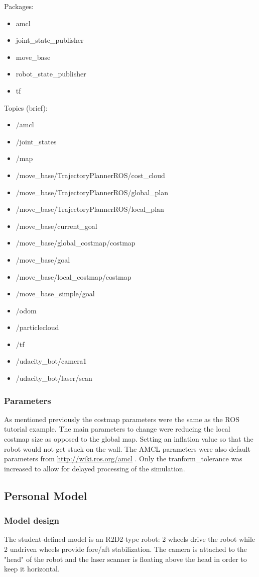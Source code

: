 \documentclass[10pt,journal,compsoc]{IEEEtran}
\begin{document}
Packages:
\begin{itemize}
\item amcl
\item joint\_state\_publisher
\item move\_base
\item robot\_state\_publisher
\item tf
\end {itemize}
Topics (brief):
\begin{itemize}
\item /amcl
\item /joint\_states
\item /map
\item /move\_base/TrajectoryPlannerROS/cost\_cloud
\item /move\_base/TrajectoryPlannerROS/global\_plan
\item /move\_base/TrajectoryPlannerROS/local\_plan
\item /move\_base/current\_goal
\item /move\_base/global\_costmap/costmap
\item /move\_base/goal
\item /move\_base/local\_costmap/costmap
\item /move\_base\_simple/goal
\item /odom
\item /particlecloud
\item /tf
\item /udacity\_bot/camera1
\item /udacity\_bot/laser/scan
\end {itemize}

\subsubsection{Parameters}
As mentioned previously the costmap parameters were the same as the ROS tutorial example. The main parameters to change were reducing the local costmap size as opposed to the global map. Setting an inflation value so that the robot would not get stuck on the wall.
The AMCL parameters were also default parameters from
\url{http://wiki.ros.org/amcl}
. Only the tranform\_tolerance was increased to allow for delayed processing of the simulation.

\subsection{Personal Model}
\subsubsection{Model design}
The student-defined model is an R2D2-type robot: 2 wheels drive the robot while 2 undriven wheels provide fore/aft stabilization. The camera is attached to the "head" of the robot and the laser scanner is floating above the head in order to keep it horizontal.
\end{document}
